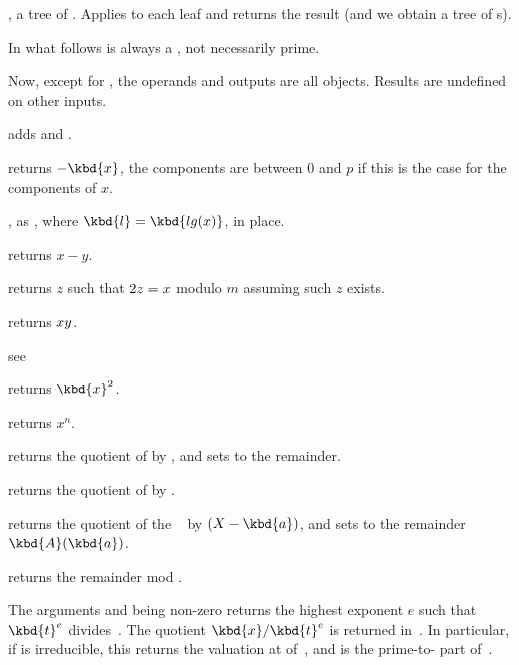 ,  a tree of . Applies
 to each leaf and returns the result (and we obtain a tree
of s).

 In what follows  is always a ,
not necessarily prime.

\noindent Now, except for , the operands and outputs are all 
objects. Results are undefined on other inputs.

 adds  and .

 returns $-\kbd{x}$, the components are
between $0$ and $p$ if this is the case for the components of $x$.

, as , where
$\kbd{l} = \kbd{lg(x)}$, in place.

 returns $x-y$.

 returns $z$ such that $2\*z = x$ modulo
$m$ assuming such $z$ exists.

 returns $x\*y$.

see 

 returns $\kbd{x}^2$.

 returns $x^n$.

 returns the quotient
of  by , and sets  to the remainder.

 returns the quotient of  by
.

 returns the
quotient of the ~ by $(X - \kbd{a})$, and sets  to the
remainder $\kbd{A}(\kbd{a})$.

 returns the remainder  mod
.

 The arguments  and
 being non-zero  returns the highest exponent $e$ such that
$\kbd{t}^{e}$ divides~. The quotient $\kbd{x}/\kbd{t}^{e}$ is returned
in~. In particular, if  is irreducible, this returns the
valuation at  of~, and  is the prime-to- part
of~.

